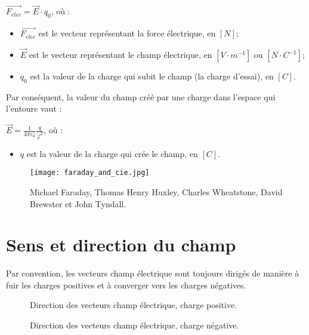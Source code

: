 \begin{encadre}
    \(\vec{F_{elec}}=\vec{E} \cdot q_0\), où :
    \begin{itemize}[label=\textbullet]
        \item \(\vec{F_{elec}}\) est le vecteur représentant la force électrique, en \([N]\);
        \item \(\vec{E}\) est le vecteur représentant le champ électrique, en \([V \cdot m^{-1}]\) ou \([N \cdot C^{-1}]\);
        \item \(q_0\) est la valeur de la charge qui subit le champ (la charge d'essai), en \([C]\).
    \end{itemize}
\end{encadre}

Par conséquent, la valeur du champ créé par une charge dans l'espace qui l'entoure vaut :
\begin{encadre}
    \(\vec{E}=\frac{1}{4 \pi \varepsilon _0} \frac{q}{\vec{r}^2}\), où :
    \begin{itemize}[label=\textbullet]
        \item \(q\) est la valeur de la charge qui crée le champ, en \([C]\).
    \end{itemize}
\end{encadre}

\begin{figure}[h!]
    \centering
    \texttt{[image: faraday\_and\_cie.jpg]}
    \caption{Michael Faraday, Thomas Henry Huxley, Charles Wheatstone, David Brewster et John Tyndall.}
    \label{club5}
\end{figure}

\newpage


\section{Sens et direction du champ}
Par convention, les vecteurs champ électrique sont toujours dirigés de manière à fuir les charges positives et à converger vers les charges négatives.
\begin{figure}[!ht]
    \centering
    \begin{minipage}[b]{.47\linewidth}
        \centering
        \resizebox{.8\linewidth}{!}{}
        \caption{Direction des vecteurs champ électrique, charge positive.}
        \label{vecteur_champ_q+}
    \end{minipage}
    \begin{minipage}[b]{.47\linewidth}
        \centering
        \resizebox{.8\linewidth}{!}{}
        \caption{Direction des vecteurs champ électrique, charge négative.}
        \label{vecteur_champ_q-}
    \end{minipage}
\end{figure}

